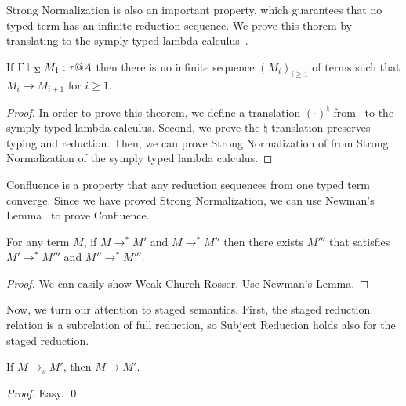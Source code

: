 Strong Normalization is also an important property, which guarantees that
no typed term has an infinite reduction sequence.
We prove this thorem by translating \LMD to the symply typed lambda calculus~\cite{harper1993framework}.

\begin{theorem}
	If $\G\V M_1:\tau@A$ then there is no infinite sequence $(M_i)_{i\ge1}$ of terms such that
	$M_i \longrightarrow M_{i+1}$ for $i\ge 1$.
\end{theorem}

\begin{proof}
	In order to prove this theorem, we define a translation $(\cdot)^\natural$ from \LMD\ to the symply typed lambda calculus.
	Second, we prove the $\natural$-translation preserves typing and reduction.
	Then, we can prove Strong Normalization of \LMD from Strong Normalization of the symply typed lambda calculus.
\end{proof}

Confluence is a property that any reduction sequences from one typed term converge.
Since we have proved Strong Normalization, we can use Newman's Lemma~\cite{} to prove Confluence.

\begin{theorem}[Confluence]
	For any term $M$, if $M \longrightarrow^* M'$ and $M \longrightarrow^* M''$ then
	there exists $M'''$ that satisfies $M' \longrightarrow^* M'''$ and $M'' \longrightarrow^* M'''$.
\end{theorem}

\begin{proof}
  We can easily show Weak Church-Rosser.  Use Newman's Lemma.
\end{proof}

Now, we turn our attention to staged semantics.  First, the staged
reduction relation is a subrelation of full reduction, so Subject
Reduction holds also for the staged reduction.

\begin{theorem}
  If $M \longrightarrow_s M'$, then $M \longrightarrow M'$.
\end{theorem}
\begin{proof}
  Easy.
 \qed
\end{proof}

